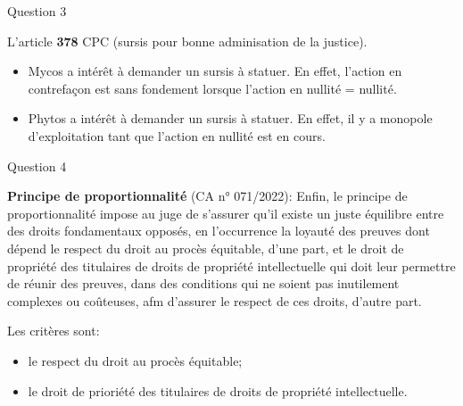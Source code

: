 \begin{frame}{Question 3}

\begin{block}{}
L'article \textbf{378} CPC (sursis pour bonne
adminisation de la justice).
\end{block}

\begin{itemize}
  \item Mycos a intérêt à demander un sursis à statuer.
  En effet, l'action en contrefaçon est sans fondement
  lorsque l'action en nullité = nullité.
  \item Phytos a intérêt à demander un sursis à statuer.
  En effet, il y a monopole d'exploitation tant que
  l'action en nullité est en cours.
\end{itemize}

\end{frame}


\begin{frame}{Question 4}

\begin{block}{}
\textbf{Principe de proportionnalité} (CA n° 071/2022): Enfin, le principe de proportionnalité impose au juge de s'assurer qu'il existe un juste 
équilibre entre des droits fondamentaux opposés, en l'occurrence la loyauté des preuves 
dont dépend le respect du droit au procès équitable, d'une part, et le droit de propriété des 
titulaires de droits de propriété intellectuelle qui doit leur permettre de réunir des preuves, 
dans des conditions qui ne soient pas inutilement complexes ou coûteuses, afm d'assurer 
le respect de ces droits, d'autre part. 
\end{block}

Les critères sont:
\begin{itemize}
  \item le respect du droit au procès équitable;
  \item le droit de prioriété des titulaires de droits
  de propriété intellectuelle.
\end{itemize}

\end{frame}